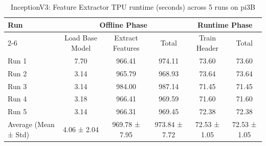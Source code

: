 \begin{table}[t]
\centering
\caption{InceptionV3: Feature Extractor TPU runtime (seconds) across 5 runs on pi3B}
\label{tab:runtime_inceptionv3_EdgeTPU_pi3B}
\begin{tabular}{lccccc}
\hline
\multirow{2}{*}{Run} & \multicolumn{3}{c}{Offline Phase} & \multicolumn{2}{c}{Runtime Phase} \\
\cline{2-6}
 & Load Base Model & Extract Features & Total & Train Header & Total \\
\hline
  Run 1                  & 7.70           & 966.41         & 974.11         & 73.60          & 73.60          \\
  Run 2                  & 3.14           & 965.79         & 968.93         & 73.64          & 73.64          \\
  Run 3                  & 3.14           & 984.00         & 987.14         & 71.45          & 71.45          \\
  Run 4                  & 3.18           & 966.41         & 969.59         & 71.60          & 71.60          \\
  Run 5                  & 3.14           & 966.31         & 969.45         & 72.38          & 72.38          \\
\hline
  Average (Mean ± Std)   & 4.06 ± 2.04    & 969.78 ± 7.95  & 973.84 ± 7.72  & 72.53 ± 1.05   & 72.53 ± 1.05   \\
\hline
\end{tabular}
\end{table}
